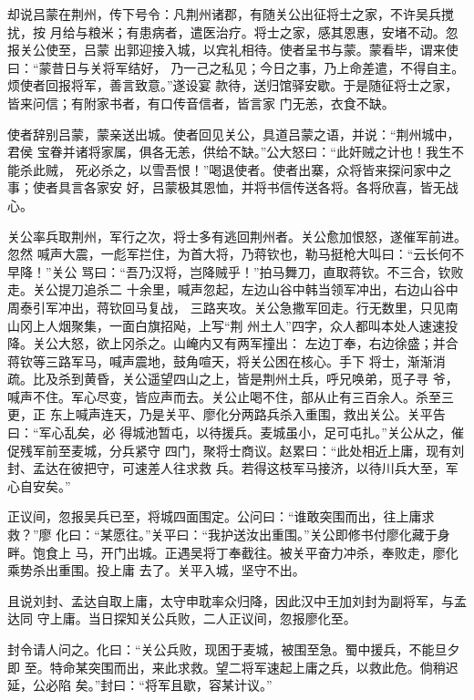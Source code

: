 却说吕蒙在荆州，传下号令：凡荆州诸郡，有随关公出征将士之家，不许吴兵搅扰，按
月给与粮米；有患病者，遣医治疗。将士之家，感其恩惠，安堵不动。忽报关公使至，吕蒙
出郭迎接入城，以宾礼相待。使者呈书与蒙。蒙看毕，谓来使曰：“蒙昔日与关将军结好，
乃一己之私见；今日之事，乃上命差遣，不得自主。烦使者回报将军，善言致意。”遂设宴
款待，送归馆驿安歇。于是随征将士之家，皆来问信；有附家书者，有口传音信者，皆言家
门无恙，衣食不缺。

使者辞别吕蒙，蒙亲送出城。使者回见关公，具道吕蒙之语，并说：“荆州城中，君侯
宝眷并诸将家属，俱各无恙，供给不缺。”公大怒曰：“此奸贼之计也！我生不能杀此贼，
死必杀之，以雪吾恨！”喝退使者。使者出寨，众将皆来探问家中之事；使者具言各家安
好，吕蒙极其恩恤，并将书信传送各将。各将欣喜，皆无战心。

关公率兵取荆州，军行之次，将士多有逃回荆州者。关公愈加恨怒，遂催军前进。忽然
喊声大震，一彪军拦住，为首大将，乃蒋钦也，勒马挺枪大叫曰：“云长何不早降！”关公
骂曰：“吾乃汉将，岂降贼乎！”拍马舞刀，直取蒋钦。不三合，钦败走。关公提刀追杀二
十余里，喊声忽起，左边山谷中韩当领军冲出，右边山谷中周泰引军冲出，蒋钦回马复战，
三路夹攻。关公急撒军回走。行无数里，只见南山冈上人烟聚集，一面白旗招飐，上写“荆
州土人”四字，众人都叫本处人速速投降。关公大怒，欲上冈杀之。山崦内又有两军撞出：
左边丁奉，右边徐盛；并合蒋钦等三路军马，喊声震地，鼓角喧天，将关公困在核心。手下
将士，渐渐消疏。比及杀到黄昏，关公遥望四山之上，皆是荆州土兵，呼兄唤弟，觅子寻
爷，喊声不住。军心尽变，皆应声而去。关公止喝不住，部从止有三百余人。杀至三更，正
东上喊声连天，乃是关平、廖化分两路兵杀入重围，救出关公。关平告曰：“军心乱矣，必
得城池暂屯，以待援兵。麦城虽小，足可屯扎。”关公从之，催促残军前至麦城，分兵紧守
四门，聚将士商议。赵累曰：“此处相近上庸，现有刘封、孟达在彼把守，可速差人往求救
兵。若得这枝军马接济，以待川兵大至，军心自安矣。”

正议间，忽报吴兵已至，将城四面围定。公问曰：“谁敢突围而出，往上庸求救？”廖
化曰：“某愿往。”关平曰：“我护送汝出重围。”关公即修书付廖化藏于身畔。饱食上
马，开门出城。正遇吴将丁奉截往。被关平奋力冲杀，奉败走，廖化乘势杀出重围。投上庸
去了。关平入城，坚守不出。

且说刘封、孟达自取上庸，太守申耽率众归降，因此汉中王加刘封为副将军，与孟达同
守上庸。当日探知关公兵败，二人正议间，忽报廖化至。

封令请人问之。化曰：“关公兵败，现困于麦城，被围至急。蜀中援兵，不能旦夕即
至。特命某突围而出，来此求救。望二将军速起上庸之兵，以救此危。倘稍迟延，公必陷
矣。”封曰：“将军且歇，容某计议。”

